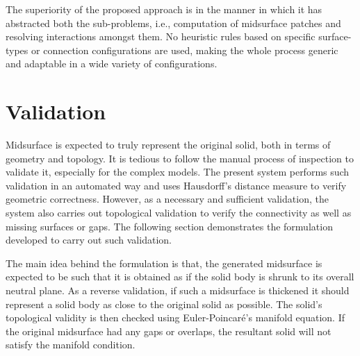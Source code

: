 
The superiority of the proposed approach is in the manner in which it has abstracted both the sub-problems, i.e., computation of midsurface patches and resolving interactions amongst them. No heuristic rules based on specific surface-types or connection configurations are used, making the whole process generic and adaptable in a wide variety of configurations.

%


	

\section{Validation}
\label{Validation}

Midsurface is expected to truly represent the original solid, both in terms of geometry and topology. It is tedious to follow the manual process of inspection to validate it, especially for the complex models. The present system performs such validation in an automated way and uses Hausdorff's distance measure to verify geometric correctness. However, as a necessary and sufficient validation, the system also carries out topological validation to verify the connectivity as well as missing surfaces or gaps. The following section demonstrates the formulation developed to carry out such validation.%

The main idea behind the formulation is that, the generated midsurface is expected to be such that it is obtained as if the solid body is shrunk to its overall neutral plane. As a reverse validation, if such a midsurface is thickened it should represent a solid body as close to the original solid as possible. The solid's topological validity is then checked using Euler-Poincar\'e's manifold equation. If the original midsurface had any gaps or overlaps, the resultant solid will not satisfy the manifold condition. 

